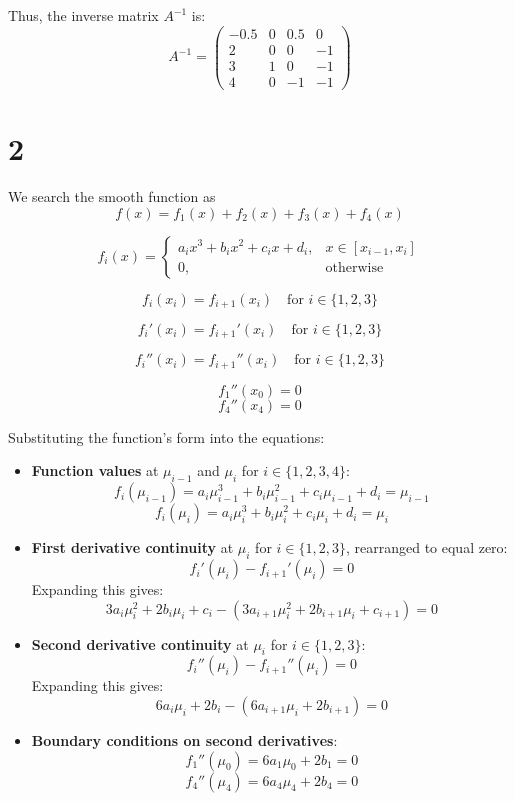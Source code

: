 \documentclass{article}
\begin{document}
Thus, the inverse matrix \( A^{-1} \) is:
\[
    A^{-1} = \begin{pmatrix}
        -0.5 & 0 & 0.5 & 0  \\
        2    & 0 & 0   & -1 \\
        3    & 1 & 0   & -1 \\
        4    & 0 & -1  & -1
    \end{pmatrix}
\]

\section*{2}
We search the smooth function as
\[
    f(x) = f_1(x) + f_2(x) + f_3(x) + f_4(x)
\]

\[
    f_i(x) =
    \begin{cases}
        a_i x^3 + b_i x^2 + c_i x + d_i, & x \in [x_{i-1}, x_i] \\
        0,                               & \text{otherwise}
    \end{cases}
\]

\[
    f_i(x_i) = f_{i+1}(x_i) \quad \text{for } i \in \{1, 2, 3\}
\]

\[
    f_i'(x_i) = f_{i+1}'(x_i) \quad \text{for } i \in \{1, 2, 3\}
\]

\[
    f_i''(x_i) = f_{i+1}''(x_i) \quad \text{for } i \in \{1, 2, 3\}
\]

\[
    f_1''(x_0) = 0
\]
\[
    f_4''(x_4) = 0
\]

Substituting the function's form into the equations:
\begin{itemize}
    \item \textbf{Function values} at \( \mu_{i-1} \) and \( \mu_i \) for \( i \in \{1, 2, 3, 4\} \):
          \[
              f_i(\mu_{i-1}) = a_i \mu_{i-1}^3 + b_i \mu_{i-1}^2 + c_i \mu_{i-1} + d_i = \mu_{i-1}
          \]
          \[
              f_i(\mu_i) = a_i \mu_i^3 + b_i \mu_i^2 + c_i \mu_i + d_i = \mu_i
          \]

    \item \textbf{First derivative continuity} at \( \mu_i \) for \( i \in \{1, 2, 3\} \), rearranged to equal zero:
          \[
              f_i'(\mu_i) - f_{i+1}'(\mu_i) = 0
          \]
          Expanding this gives:
          \[
              3 a_i \mu_i^2 + 2 b_i \mu_i + c_i - (3 a_{i+1} \mu_i^2 + 2 b_{i+1} \mu_i + c_{i+1}) = 0
          \]

    \item \textbf{Second derivative continuity} at \( \mu_i \) for \( i \in \{1, 2, 3\} \):
          \[
              f_i''(\mu_i) - f_{i+1}''(\mu_i) = 0
          \]
          Expanding this gives:
          \[
              6 a_i \mu_i + 2 b_i - (6 a_{i+1} \mu_i + 2 b_{i+1}) = 0
          \]

    \item \textbf{Boundary conditions on second derivatives}:
          \[
              f_1''(\mu_0) = 6 a_1 \mu_0 + 2 b_1 = 0
          \]
          \[
              f_4''(\mu_4) = 6 a_4 \mu_4 + 2 b_4 = 0
          \]
\end{itemize}
\end{document}
